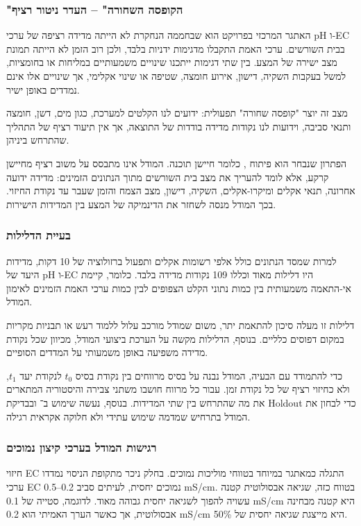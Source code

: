 \subsubsection{"הקופסה השחורה" -- העדר ניטור רציף}
האתגר המרכזי בפרויקט הוא שבחממה הנחקרת לא הייתה מדידה רציפה של ערכי pH ו-EC בבית השורשים. ערכי האמת התקבלו מדגימות ידניות בלבד, ולכן רוב הזמן לא הייתה תמונת מצב ישירה של המצע. בין שתי דגימות ייתכנו שינויים משמעותיים במליחות או בחומציות, למשל בעקבות השקיה, דישון, אירוע חומצה, שטיפה או שינוי אקלימי, אך שינויים אלו אינם נמדדים באופן ישיר.

מצב זה יוצר "קופסה שחורה" תפעולית: ידועים לנו הקלטים למערכת, כגון מים, דשן, חומצה ותנאי סביבה, וידועות לנו נקודות מדידה בודדות של התוצאה, אך אין תיעוד רציף של התהליך שהתרחש ביניהן.

הפתרון שנבחר הוא פיתוח \SoftSensor{}, כלומר חיישן תוכנה. המודל אינו מתבסס על משוב רציף מחיישן קרקע, אלא לומד להעריך את מצב בית השורשים מתוך הנתונים הזמינים: מדידה ידועה אחרונה, תנאי אקלים ומיקרו-אקלים, השקיה, דישון, מצב הצמח והזמן שעבר עד נקודת החיזוי. בכך המודל מנסה לשחזר את הדינמיקה של המצע בין המדידות הישירות.

\subsubsection{בעיית הדלילות}
למרות שמסד הנתונים כולל אלפי רשומות אקלים ותפעול ברזולוציה של 10 דקות, מדידות היעד של pH ו-EC היו דלילות מאוד וכללו 109 נקודות מדידה בלבד. כלומר, קיימת אי-התאמה משמעותית בין כמות נתוני הקלט הצפופים לבין כמות ערכי האמת הזמינים לאימון המודל.

דלילות זו מעלה סיכון להתאמת יתר, משום שמודל מורכב עלול ללמוד רעש או תבניות מקריות במקום דפוסים כלליים. בנוסף, הדלילות מקשה על הערכת ביצועי המודל, מכיוון שכל נקודת מדידה משפיעה באופן משמעותי על המדדים הסופיים.

כדי להתמודד עם הבעיה, המודל נבנה על בסיס מרווחים בין נקודת בסיס $t_0$ לנקודת יעד $t_1$, ולא כחיזוי רציף של כל נקודת זמן. עבור כל מרווח חושבו משתני צבירה והיסטוריה המתארים את מה שהתרחש בין שתי המדידות. בנוסף, נעשה שימוש ב־\WFV{} ובבדיקת Holdout כדי לבחון את המודל בתרחיש שמדמה שימוש עתידי ולא חלוקה אקראית רגילה.

\subsubsection{רגישות המודל בערכי קיצון נמוכים}
חיזוי EC התגלה כמאתגר במיוחד בטווחי מוליכות נמוכים. בחלק ניכר מתקופת הניסוי נמדדו ערכי EC נמוכים יחסית, לעיתים סביב 0.2--0.5 mS/cm. בטווח כזה, שגיאה אבסולוטית קטנה עשויה להפוך לשגיאה יחסית גבוהה מאוד. לדוגמה, סטייה של 0.1 mS/cm היא קטנה מבחינה אבסולוטית, אך כאשר הערך האמיתי הוא 0.2 mS/cm היא מייצגת שגיאה יחסית של 50\%.

